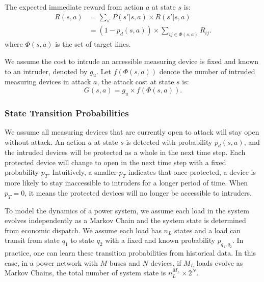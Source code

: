 \documentclass[conference,letterpaper,10pt]{IEEEtran}
\begin{document}
The expected immediate reward from action $a$ at state $s$ is:
\begin{equation}\label{eqn: expected reward}
\begin{split}
R(s,a) & =\sum_{s'}P(s'|s,a)\times R(s'|s,a)\\
& =(1-p_d(s,a))\times \sum_{ij\in \Phi(s,a)}R_{ij}.
\end{split}
\end{equation}
where $\Phi(s,a)$ is the set of target lines. 

We assume the cost to intrude an accessible  measuring device is fixed and known to an intruder, denoted by $g_u$. Let $f(\Phi(s,a))$ denote the number of intruded measuring devices in attack $a$, the attack cost at state $s$ is:
\begin{equation}\label{Formula: attack cost}
G(s,a)=g_u\times f(\Phi(s,a)).
\end{equation}





\subsubsection{State Transition Probabilities}
We assume all measuring devices that are currently open to attack  will stay open without attack. An action $a$ at state $s$ is detected  with probability $p_d(s,a)$, and the intruded  devices will be protected as a whole in the next time step.  Each protected device will change to open in the next time step with a fixed probability $p_T$. Intuitively,  a smaller $p_T$ indicates that once protected, a device is more likely to stay inaccessible to intruders for a longer period of  time.  When $p_T=0$, it means the protected devices will no longer be accessible to intruders.

To model the dynamics of a power system, we assume each load in the system evolves independently as a Markov Chain \cite{MP94} and the system state is determined from economic dispatch. We assume each load has $n_L$ states and a load can transit from state $q_1$ to state $q_2$ with a fixed and known probability $p_{q_1,q_2}$. In practice, one can learn these transition probabilities from historical data. In this case, in a power network with $M$ buses and $N$ devices, if $M_L$ loads evolve as Markov Chains, the total number of system state is $n_L^{M_L}\times2^N$.
\end{document}
